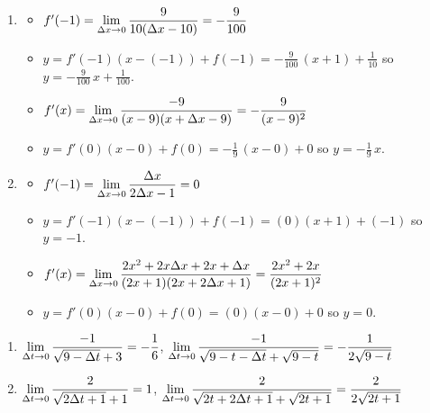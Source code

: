 \documentclass{ximera}
\begin{document}
\begin{enumerate}
\setcounter{enumi}{\value{HW}}

\item   \begin{itemize}

\item  $f'(-1) = \ds{ \lim_{\Delta x \rightarrow 0} \dfrac{9}{10(\Delta x - 10)} = -\dfrac{9}{100}}$

\smallskip

\item $y = f'(-1)(x-(-1)) + f(-1) = -\frac{9}{100} \, (x+1) + \frac{1}{10}$ so $y = - \frac{9}{100} \, x + \frac{1}{100}$.

\smallskip

\item  $f'(x) =\ds{ \lim_{\Delta x \rightarrow 0} \dfrac{-9}{(x - 9)(x + \Delta x - 9)} =   -\dfrac{9}{(x-9)^2}}$   

\smallskip  

\item  $y = f'(0)(x-0) + f(0) = -\frac{1}{9} \, (x-0)+0$ so $y = -\frac{1}{9} \, x$.

\smallskip

\end{itemize}

\item \begin{itemize}  

\item  $f'(-1) = \ds{ \lim_{\Delta x \rightarrow 0} \dfrac{\Delta x}{2 \Delta x - 1} = 0}$

\smallskip

\item $y = f'(-1)(x-(-1)) + f(-1) = (0) (x+1) + (-1)$ so $y = -1$.

\smallskip

\item  $f'(x) =\ds{ \lim_{\Delta x \rightarrow 0}\dfrac{2x^2+2x\Delta x+2x+\Delta x}{(2x+1)(2x+2\Delta x+1)}=  \dfrac{2x^2+2x}{(2x+1)^2}}$

\smallskip

\item  $y = f'(0)(x-0) + f(0) = (0)(x-0)+0$ so $y = 0$.

\smallskip

\end{itemize}


\setcounter{HW}{\value{enumi}}
\end{enumerate}

\begin{enumerate}
\setcounter{enumi}{\value{HW}}

\item  $\ds{ \lim_{\Delta t \rightarrow 0}\dfrac{-1}{\sqrt{9-\Delta t} +3}  = -\dfrac{1}{6}}$,   $\ds{ \lim_{\Delta t \rightarrow 0} \dfrac{-1}{\sqrt{9-t-\Delta t} + \sqrt{9-t}}=   -\dfrac{1}{2 \sqrt{9-t}}}$   
\item  $\ds{ \lim_{\Delta t \rightarrow 0}\dfrac{2}{\sqrt{2\Delta t+1} + 1}  =1}$,   $\ds{ \lim_{\Delta t \rightarrow 0}\dfrac{2}{\sqrt{2t+2\Delta t+1} + \sqrt{2t+1}}=   \dfrac{2}{2 \sqrt{2t+1}}}$    

\setcounter{HW}{\value{enumi}}
\end{enumerate}
\end{document}
